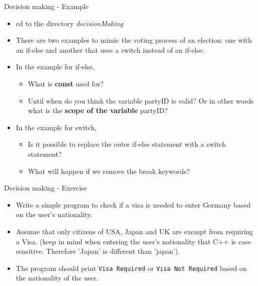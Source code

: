 \documentclass[aspectratio=169]{beamer}
\begin{document}
\begin{frame}[fragile]{Decision making - Example}
    \begin{itemize}
        \item cd to the directory \textit{decisionMaking}
        \item There are two examples to mimic the voting process of an election: one with an if-else and another that uses a switch instead of an if-else.
        \item In the example for if-else,
        \begin{itemize}
            \item What is \textbf{const} used for?
            \item Until when do you think the variable partyID is valid? Or in other words what is the \textbf{scope of the variable} partyID?
        \end{itemize}
        \item In the example for switch,
        \begin{itemize}
            \item Is it possible to replace the outer if-else statement with a switch statement?
            \item What will happen if we remove the break keywords?
        \end{itemize}
    \end{itemize}
\end{frame}

\begin{frame}[fragile]{Decision making - Exercise}
    \begin{itemize}
        \item Write a simple program to check if a visa is needed to enter Germany based on the user's nationality.
        \item Assume that only citizens of USA, Japan and UK are exempt from requiring a Visa. (keep in mind when entering the user's nationality that C++ is case sensitive. Therefore 'Japan' is different than 'japan').
        \item The program should print \verb|Visa Required| or \verb|Visa Not Required| based on the nationality of the user.
    \end{itemize}
\end{frame}
\end{document}
